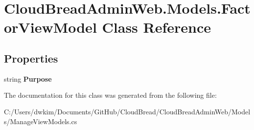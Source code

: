 \hypertarget{a00077}{}\section{Cloud\+Bread\+Admin\+Web.\+Models.\+Factor\+View\+Model Class Reference}
\label{a00077}
\subsection*{Properties}
\begin{DoxyCompactItemize}
\item 
string {\bfseries Purpose}\hypertarget{a00077_aeae54cc6159853dbd9931d76366b9124}{}\label{a00077_aeae54cc6159853dbd9931d76366b9124}

\end{DoxyCompactItemize}


The documentation for this class was generated from the following file\+:\begin{DoxyCompactItemize}
\item 
C\+:/\+Users/dwkim/\+Documents/\+Git\+Hub/\+Cloud\+Bread/\+Cloud\+Bread\+Admin\+Web/\+Models/Manage\+View\+Models.\+cs\end{DoxyCompactItemize}
